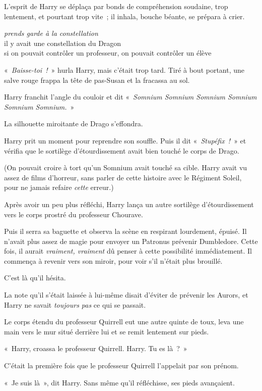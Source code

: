 L'esprit de Harry se déplaça par bonds de compréhension soudaine, trop lentement, et pourtant trop vite~; il inhala, bouche béante, se prépara à crier.

\emph{prends garde à la constellation}\\ il y avait une constellation du Dragon\\ si on pouvait contrôler un professeur, on pouvait contrôler un élève

«~\emph{Baisse-toi~!}~» hurla Harry, mais c'était trop tard. Tiré à bout portant, une salve rouge frappa la tête de pas-Susan et la fracassa au sol.

Harry franchit l'angle du couloir et dit «~\emph{Somnium Somnium Somnium Somnium Somnium Somnium.}~»

La silhouette miroitante de Drago s'effondra.

Harry prit un moment pour reprendre son souffle. Puis il dit «~\emph{Stupéfix~!}~» et vérifia que le sortilège d'étourdissement avait bien touché le corps de Drago.

(On pouvait croire à tort qu'un Somnium avait touché sa cible. Harry avait vu assez de films d'horreur, sans parler de cette histoire avec le Régiment Soleil, pour ne jamais refaire \emph{cette} erreur.)

Après avoir un peu plus réfléchi, Harry lança un autre sortilège d'étourdissement vers le corps prostré du professeur Chourave.

Puis il serra sa baguette et observa la scène en respirant lourdement, épuisé. Il n'avait plus assez de magie pour envoyer un Patronus prévenir Dumbledore. Cette fois, il aurait \emph{vraiment, vraiment} dû penser à cette possibilité immédiatement. Il commença à revenir vers son miroir, pour voir s'il n'était plus brouillé.

C'est là qu'il hésita.

La note qu'il s'était laissée à lui-même disait d'éviter de prévenir les Aurors, et Harry ne savait \emph{toujours pas} ce qui se passait.

Le corps étendu du professeur Quirrell eut une autre quinte de toux, leva une main vers le mur situé derrière lui et se remit lentement sur pieds.

«~Harry, croassa le professeur Quirrell. Harry. Tu es là~?~»

C'était la première fois que le professeur Quirrell l'appelait par son prénom.

«~Je suis là~», dit Harry. Sans même qu'il réfléchisse, ses pieds avançaient.

